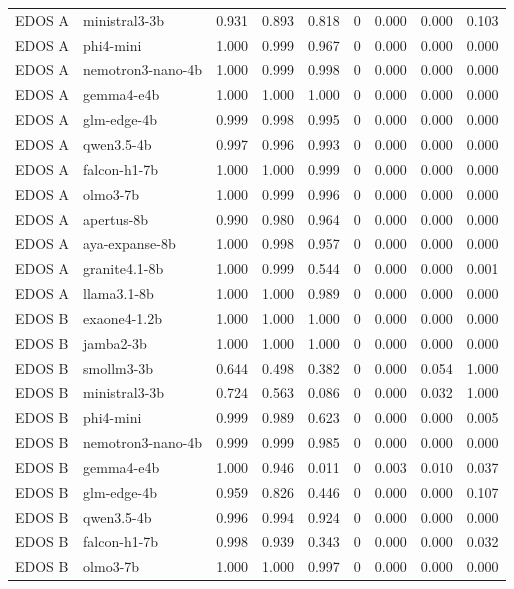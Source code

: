 \begin{table}[t]
\begin{tabular}{llrrrrrrr}
EDOS A & ministral3-3b & 0.931 & 0.893 & 0.818 & 0 & 0.000 & 0.000 & 0.103 \\
EDOS A & phi4-mini & 1.000 & 0.999 & 0.967 & 0 & 0.000 & 0.000 & 0.000 \\
EDOS A & nemotron3-nano-4b & 1.000 & 0.999 & 0.998 & 0 & 0.000 & 0.000 & 0.000 \\
EDOS A & gemma4-e4b & 1.000 & 1.000 & 1.000 & 0 & 0.000 & 0.000 & 0.000 \\
EDOS A & glm-edge-4b & 0.999 & 0.998 & 0.995 & 0 & 0.000 & 0.000 & 0.000 \\
EDOS A & qwen3.5-4b & 0.997 & 0.996 & 0.993 & 0 & 0.000 & 0.000 & 0.000 \\
EDOS A & falcon-h1-7b & 1.000 & 1.000 & 0.999 & 0 & 0.000 & 0.000 & 0.000 \\
EDOS A & olmo3-7b & 1.000 & 0.999 & 0.996 & 0 & 0.000 & 0.000 & 0.000 \\
EDOS A & apertus-8b & 0.990 & 0.980 & 0.964 & 0 & 0.000 & 0.000 & 0.000 \\
EDOS A & aya-expanse-8b & 1.000 & 0.998 & 0.957 & 0 & 0.000 & 0.000 & 0.000 \\
EDOS A & granite4.1-8b & 1.000 & 0.999 & 0.544 & 0 & 0.000 & 0.000 & 0.001 \\
EDOS A & llama3.1-8b & 1.000 & 1.000 & 0.989 & 0 & 0.000 & 0.000 & 0.000 \\
EDOS B & exaone4-1.2b & 1.000 & 1.000 & 1.000 & 0 & 0.000 & 0.000 & 0.000 \\
EDOS B & jamba2-3b & 1.000 & 1.000 & 1.000 & 0 & 0.000 & 0.000 & 0.000 \\
EDOS B & smollm3-3b & 0.644 & 0.498 & 0.382 & 0 & 0.000 & 0.054 & 1.000 \\
EDOS B & ministral3-3b & 0.724 & 0.563 & 0.086 & 0 & 0.000 & 0.032 & 1.000 \\
EDOS B & phi4-mini & 0.999 & 0.989 & 0.623 & 0 & 0.000 & 0.000 & 0.005 \\
EDOS B & nemotron3-nano-4b & 0.999 & 0.999 & 0.985 & 0 & 0.000 & 0.000 & 0.000 \\
EDOS B & gemma4-e4b & 1.000 & 0.946 & 0.011 & 0 & 0.003 & 0.010 & 0.037 \\
EDOS B & glm-edge-4b & 0.959 & 0.826 & 0.446 & 0 & 0.000 & 0.000 & 0.107 \\
EDOS B & qwen3.5-4b & 0.996 & 0.994 & 0.924 & 0 & 0.000 & 0.000 & 0.000 \\
EDOS B & falcon-h1-7b & 0.998 & 0.939 & 0.343 & 0 & 0.000 & 0.000 & 0.032 \\
EDOS B & olmo3-7b & 1.000 & 1.000 & 0.997 & 0 & 0.000 & 0.000 & 0.000 \\

\end{tabular}
\end{table}

